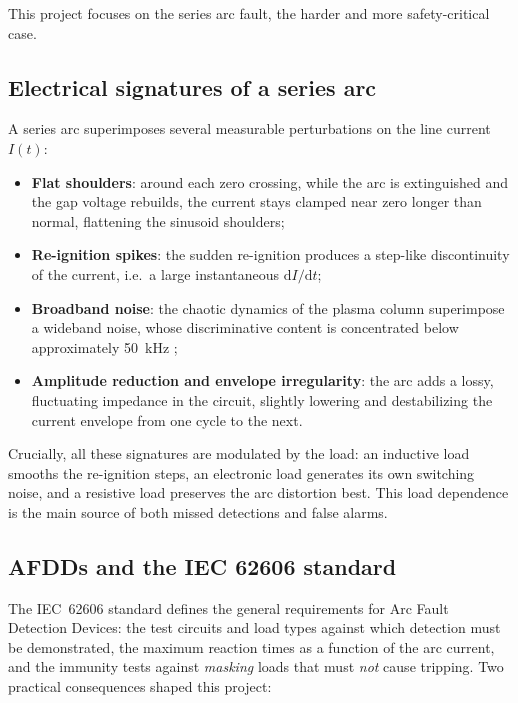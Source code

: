 This project focuses on the series arc fault, the harder and more safety-critical case.

\subsection{Electrical signatures of a series arc}
\label{sec:signatures}

A series arc superimposes several measurable perturbations on the line current $I(t)$:

\begin{itemize}[itemsep=2pt]
    \item \textbf{Flat shoulders}: around each zero crossing, while the arc is extinguished and the gap voltage rebuilds, the current stays clamped near zero longer than normal, flattening the sinusoid shoulders;
    \item \textbf{Re-ignition spikes}: the sudden re-ignition produces a step-like discontinuity of the current, i.e.\ a large instantaneous $\mathrm{d}I/\mathrm{d}t$;
    \item \textbf{Broadband noise}: the chaotic dynamics of the plasma column superimpose a wideband noise, whose discriminative content is concentrated below approximately 50~kHz \cite{dowalla2023,ning2024interp};
    \item \textbf{Amplitude reduction and envelope irregularity}: the arc adds a lossy, fluctuating impedance in the circuit, slightly lowering and destabilizing the current envelope from one cycle to the next.
\end{itemize}

Crucially, all these signatures are modulated by the load: an inductive load smooths the re-ignition steps, an electronic load generates its own switching noise, and a resistive load preserves the arc distortion best. This load dependence is the main source of both missed detections and false alarms.

\subsection{AFDDs and the IEC 62606 standard}

The IEC~62606 standard \cite{iec62606} defines the general requirements for Arc Fault Detection Devices: the test circuits and load types against which detection must be demonstrated, the maximum reaction times as a function of the arc current, and the immunity tests against \emph{masking} loads that must \emph{not} cause tripping. Two practical consequences shaped this project:

